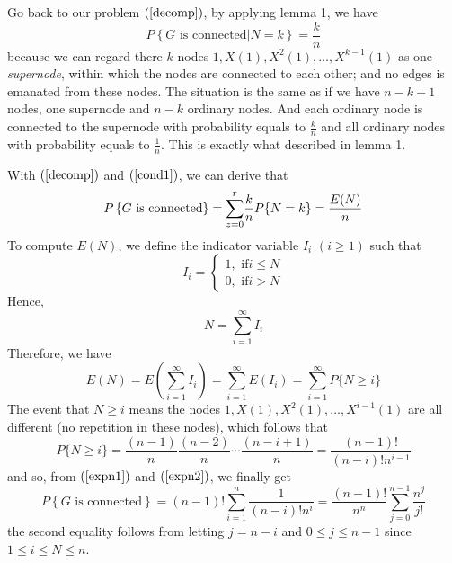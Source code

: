 \documentclass{IEEEconf}
\newcommand{\tmtextit}[1]{{\itshape{#1}}}
\begin{document}
Go back to our problem $\left( \ref{decomp} \right)$, by applying lemma 1, we
have
\begin{equation}
  P \left\{ G \text{ is connected} |N = k \right\} = \frac{k}{n} \label{cond1}
\end{equation}
because we can regard there $k$ nodes $1, X (1), X^2 (1), \ldots, X^{k - 1}
(1)$ as one \tmtextit{supernode}, within which the nodes are connected to each
other; and no edges is emanated from these nodes. The situation is the same as
if we have $n - k + 1$ nodes, one supernode and $n - k$ ordinary nodes. And
each ordinary node is connected to the supernode with probability equals to
$\frac{k}{n}$ and all ordinary nodes with probability equals to $\frac{1}{n}$.
This is exactly what described in lemma 1.

With $\left( \ref{decomp} \right)$ and $\left( \ref{cond1} \right)$, we can
derive that
\begin{equation}
  P \left\{ G \text{ is connected} \right\} = {%
  \overset{r}{\underset{z = 0}{\sum}}} \frac{k}{n} P \{ N = k \} = \frac{E
  (N)}{n} \label{expn1}
\end{equation}
To compute $E (N)$, we define the indicator variable $I_i$ $(i \geqslant 1)$
such that
\[ I_i = \left\{ \begin{array}{l}
     1, \text{ \ \ \ if} i \leqslant N\\
     0, \text{ \ \ \ if} i > N
   \end{array} \right. \]
Hence,
\[ N = \overset{\infty}{\underset{i = 1}{\sum}} I_i \]
Therefore, we have
\begin{equation}
  E (N) = E \left( \overset{\infty}{\underset{i = 1}{\sum}} I_i \right) =
  \overset{\infty}{\underset{i = 1}{\sum}} E (I_i) =
  \overset{\infty}{\underset{i = 1}{\sum}} P \{ N \geqslant i \} \label{expn2}
\end{equation}
The event that $N \geqslant i$ means the nodes $1, X (1), X^2 (1), \ldots,
X^{i - 1} (1)$ are all different (no repetition in these nodes), which follows
that
\[ P \{ N \geqslant i \} = \frac{(n - 1)}{n} \frac{(n - 2)}{n} \cdots \frac{(n
   - i + 1)}{n} = \frac{(n - 1) !}{(n - i) ! n^{i - 1}} \]
and so, from $\left( \ref{expn1} \right)$ and $\left( \ref{expn2} \right)$, we
finally get
\[ P \left\{ G \text{ is connected} \right\} = (n - 1) !
   \overset{n}{\underset{i = 1}{\sum}} \frac{1}{(n - i) ! n^i} = \frac{(n - 1)
   !}{n^n}  \overset{n - 1}{\underset{j = 0}{\sum}} \frac{n^j}{j!} \]
the second equality follows from letting $j = n - i$ and $0 \leqslant j
\leqslant n - 1$ since $1 \leqslant i \leqslant N \leqslant n$.
\end{document}
